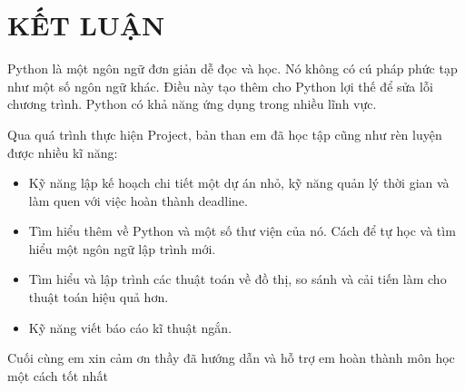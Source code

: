 \documentclass[main-report.tex]{subfiles}
\begin{document}
\part*{KẾT LUẬN}

Python là một ngôn ngữ đơn giản dễ đọc và học. Nó không có cú pháp phức tạp như một số ngôn ngữ khác. Điều này tạo thêm cho Python lợi thế để sửa lỗi chương trình. Python có khả năng ứng dụng trong nhiều lĩnh vực.

Qua quá trình thực hiện Project, bản than em đã học tập cũng như rèn luyện được nhiều kĩ năng:
\begin{itemize}
\item Kỹ năng lập kế hoạch chi tiết một dự án nhỏ, kỹ năng quản lý thời gian và làm quen với việc hoàn thành deadline.
\item Tìm hiểu thêm về Python và một số thư viện của nó. Cách để tự học và tìm hiểu một ngôn ngữ lập trình mới.
\item Tìm hiểu và lập trình các thuật toán về đồ thị, so sánh và cải tiến làm cho thuật toán hiệu quả hơn.
\item Kỹ năng viết báo cáo kĩ thuật ngắn.
\end{itemize}

Cuối cùng em xin cảm ơn thầy đã hướng dẫn và hỗ trợ em hoàn thành môn học một cách tốt nhất
\end{document}
